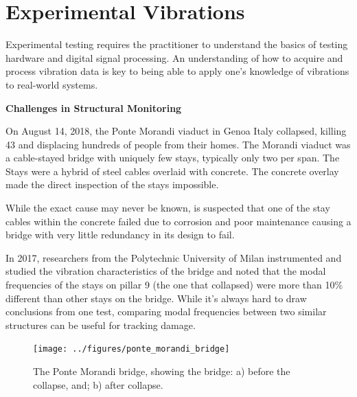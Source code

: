 \documentclass[12pt,letter]{article}
\begin{document}
	
	\setcounter{section}{6}	
	\setcounter{figure}{0}   
	\renewcommand\thefigure{\thesection.\arabic{figure}}
	\setcounter{equation}{0}   
	\renewcommand\theequation{\thesection.\arabic{equation}}

	\section{Experimental Vibrations}
	
Experimental testing requires the practitioner to understand the basics of testing hardware and digital signal processing. An understanding of how to acquire and process vibration data is key to being able to apply one's knowledge of vibrations to real-world systems.


\begin{vibration_case_study}

	\textbf{Challenges in Structural Monitoring}	

	\noindent On August 14, 2018, the Ponte Morandi viaduct in Genoa Italy collapsed, killing 43 and displacing hundreds of people from their homes. The Morandi viaduct was a cable-stayed bridge with uniquely few stays, typically only two per span. The Stays were a hybrid of steel cables overlaid with concrete. The concrete overlay made the direct inspection of the stays impossible. 
	
	While the exact cause may never be known, is suspected that one of the stay cables within the concrete failed due to corrosion and poor maintenance causing a bridge with very little redundancy in its design to fail\protect\footnotemark[1].
	
	In 2017, researchers from the Polytechnic University of Milan instrumented and studied the vibration characteristics of the bridge and noted that the modal frequencies of the stays on pillar 9 (the one that collapsed) were more than 10\% different than other stays on the bridge. While it's always hard to draw conclusions from one test, comparing modal frequencies between two similar structures can be useful for tracking damage. 
 
	\begin{figure}[H]
		\centering
		\texttt{[image: ../figures/ponte\_morandi\_bridge]}
		\caption{The Ponte Morandi bridge, showing the bridge: a) before the collapse\protect\footnotemark[2], and; b) after collapse\protect\footnotemark[3]. }
	\end{figure}
		
\end{vibration_case_study}
		
\end{document}
